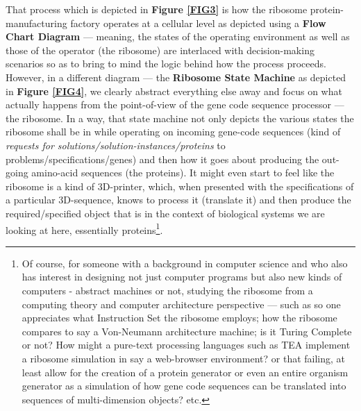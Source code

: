 \documentclass[a4paper, 18pt]{book} %
\begin{document}
That process which is depicted in \textbf{Figure \ref{FIG3}} is how the ribosome protein-manufacturing factory operates at a cellular level as depicted using a \textbf{Flow Chart Diagram} --- meaning, the states of the operating environment as well as those of the operator (the ribosome) are interlaced with decision-making scenarios so as to bring to mind the logic behind how the process proceeds. However, in a different diagram --- the \textbf{Ribosome State Machine} as depicted in \textbf{Figure \ref{FIG4}}, we clearly abstract everything else away and focus on what actually happens from the point-of-view of the gene code sequence processor --- the ribosome. In a way, that state machine not only depicts the various states the ribosome shall be in while operating on incoming gene-code sequences (kind of \textit{requests for solutions/solution-instances/proteins} to problems/specifications/genes) and then how it goes about producing the out-going amino-acid sequences (the proteins). It might even start to feel like the ribosome is a kind of 3D-printer, which, when presented with the specifications of a particular 3D-sequence, knows to process it (translate it) and then produce the required/specified object that is in the context of biological systems we are looking at here, essentially proteins\footnote{Of course, for someone with a background in computer science and who also has interest in designing not just computer programs but also new kinds of computers - abstract machines or not, studying the ribosome from a computing theory and computer architecture perspective --- such as so one appreciates what Instruction Set the ribosome employs; how the ribosome compares to say a Von-Neumann architecture machine; is it Turing Complete or not? How might a pure-text processing languages such as TEA\cite{lutalo2024software} implement a ribosome simulation in say a web-browser environment?\cite{lutalo_tea_web} or that failing, at least allow for the creation of a protein generator or even an entire organism generator as a simulation of how gene code sequences can be translated into sequences of multi-dimension objects?\cite{lutalo2025transformatic} etc.}.
\end{document}
